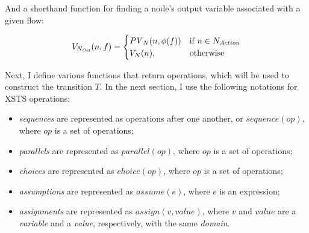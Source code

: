 And a shorthand function for finding a node's output variable associated with a given flow:

\begin{equation*}
	V_{N_\mathit{Out}}(n, f) = 
	\begin{cases}
		\mathit{PV}_N(n, \phi(f)) & \text{if } n \in N_{Action} \\
		V_N(n), & \text{otherwise}
	\end{cases}
\end{equation*}

\newcommand{\enabled}{\mathit{En}}

Next, I define various functions that return operations, which will be used to construct the transition \(T\). In the next section, I use the following notations for XSTS operations:

\begin{itemize}
	\item \emph{sequences} are represented as operations after one another, or \(\mathit{sequence}(op)\), where \(op\) is a set of operations;
	\item \emph{parallels} are represented as \(\mathit{parallel}(op)\), where \(op\) is a set of operations;
	\item \emph{choices} are represented as \(\mathit{choice}(op)\), where \(op\) is a set of operations;
	\item \emph{assumptions} are represented as \(\mathit{assume}(e)\), where \(e\) is an expression;
	\item \emph{assignments} are represented as \(\mathit{assign}(v, value)\), where \(v\) and \(value\) are a \emph{variable} and a \emph{value}, respectively, with the same \emph{domain}.
\end{itemize}

